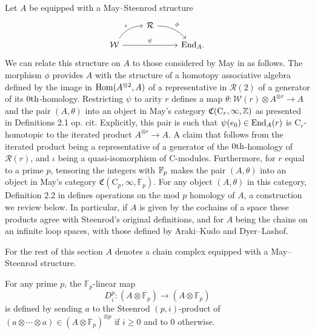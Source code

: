 Let $A$ be equipped with a May--Steenrod structure
\begin{equation*}
\begin{tikzcd}[column sep = normal, row sep = small]
& \mathcal R \arrow[dr, "\phi", out=0] & \\
\mathcal W \arrow[ur, "\iota", out=55, in=180] \arrow[rr, "\psi"] & & \End_A.
\end{tikzcd}
\end{equation*}
We can relate this structure on $A$ to those considered by May in \cite{may1970general} as follows.
The morphism $\phi$ provides $A$ with the structure of a homotopy associative algebra defined by the image in $\mathrm{Hom}(A^{\otimes 2}, A)$ of a representative in $\mathcal R(2)$ of a generator of its $0\mathrm{th}$-homology.
Restricting $\psi$ to arity $r$ defines a map $\theta \colon \mathcal W(r) \otimes A^{\otimes r} \to A$ and the pair $(A, \theta)$ into an object in May's category $\mathfrak{C}(\mathrm C_r, \infty, \mathbb{Z})$ as presented in Definitions 2.1 op. cit.
Explicitly, this pair is such that $\psi(e_0) \in \mathrm{End}_A(r)$ is $\mathrm C_r$-homotopic to the iterated product $A^{\otimes r} \to A$.
A claim that follows from the iterated product being a representative of a generator of the $0\mathrm{th}$-homology of $\mathcal R(r)$, and $\iota$ being a quasi-isomorphism of $\mathrm C$-modules.
Furthermore, for $r$ equal to a prime $p$, tensoring the integers with ${\mathbb{F}_p}$ makes the pair $(A, \theta)$ into an object in May's category $\mathfrak{C}(\mathrm C_p, \infty, \mathbb{F}_p)$.
For any object $(A, \theta)$ in this category, Definition 2.2 in \cite{may1970general} defines operations on the mod $p$ homology of $A$, a construction we review below.
In particular, if $A$ is given by the cochains of a space these products agree with Steenrod's original definitions, and for $A$ being the chains on an infinite loop spaces, with those defined by Araki--Kudo and Dyer--Lashof.

For the rest of this section $A$ denotes a chain complex equipped with a May--Steenrod structure.

\begin{definition}
	For any prime $p$, the $\mathbb{F}_p$-linear map
	\begin{equation*}
	D^p_i \colon (A \otimes \mathbb{F}_p) \to (A \otimes \mathbb{F}_p)
	\end{equation*}
	is defined by sending $a$ to the Steenrod \mbox{$(p, i)$-product} of $(a \otimes \cdots \otimes a) \in (A \otimes \mathbb{F}_p)^{\otimes p}$ if $i \geq 0$ and to $0$ otherwise.
\end{definition}

